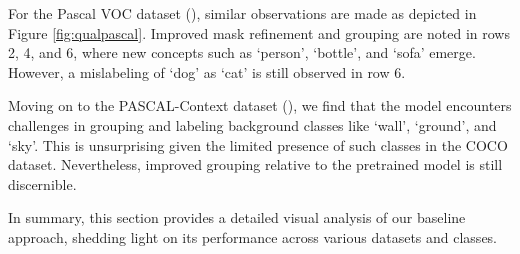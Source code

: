 For the Pascal VOC dataset (\pvoc), similar observations are made as depicted in Figure \ref{fig:qualpascal}. Improved mask refinement and grouping are noted in rows 2, 4, and 6, where new concepts such as `person', `bottle', and `sofa' emerge. However, a mislabeling of `dog' as `cat' is still observed in row 6.

Moving on to the PASCAL-Context dataset (\pcon), we find that the model encounters challenges in grouping and labeling background classes like `wall', `ground', and `sky'. This is unsurprising given the limited presence of such classes in the COCO dataset. Nevertheless, improved grouping relative to the pretrained model is still discernible.

In summary, this section provides a detailed visual analysis of our baseline approach, shedding light on its performance across various datasets and classes.





